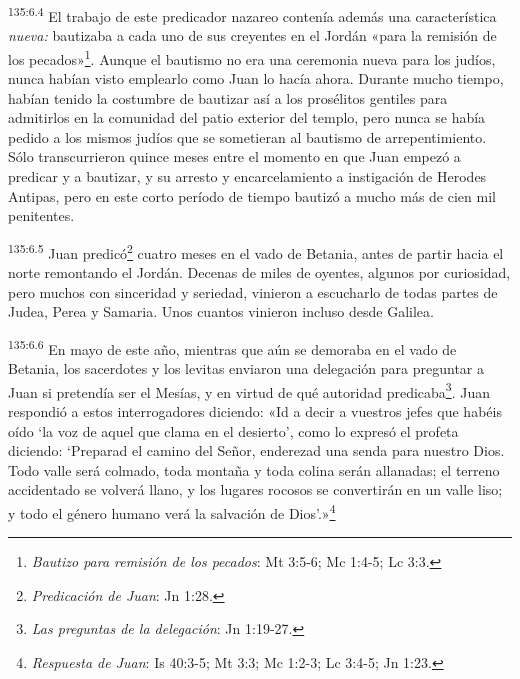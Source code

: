 \par
\textsuperscript{135:6.4} El trabajo de este predicador nazareo contenía además una característica \textit{nueva:} bautizaba a cada uno de sus creyentes en el Jordán «para la remisión de los pecados»\footnote{\textit{Bautizo para remisión de los pecados}: Mt 3:5-6; Mc 1:4-5; Lc 3:3.}. Aunque el bautismo no era una ceremonia nueva para los judíos, nunca habían visto emplearlo como Juan lo hacía ahora. Durante mucho tiempo, habían tenido la costumbre de bautizar así a los prosélitos gentiles para admitirlos en la comunidad del patio exterior del templo, pero nunca se había pedido a los mismos judíos que se sometieran al bautismo de arrepentimiento. Sólo transcurrieron quince meses entre el momento en que Juan empezó a predicar y a bautizar, y su arresto y encarcelamiento a instigación de Herodes Antipas, pero en este corto período de tiempo bautizó a mucho más de cien mil penitentes.

\par
\textsuperscript{135:6.5} Juan predicó\footnote{\textit{Predicación de Juan}: Jn 1:28.} cuatro meses en el vado de Betania, antes de partir hacia el norte remontando el Jordán. Decenas de miles de oyentes, algunos por curiosidad, pero muchos con sinceridad y seriedad, vinieron a escucharlo de todas partes de Judea, Perea y Samaria. Unos cuantos vinieron incluso desde Galilea.

\par
\textsuperscript{135:6.6} En mayo de este año, mientras que aún se demoraba en el vado de Betania, los sacerdotes y los levitas enviaron una delegación para preguntar a Juan si pretendía ser el Mesías, y en virtud de qué autoridad predicaba\footnote{\textit{Las preguntas de la delegación}: Jn 1:19-27.}. Juan respondió a estos interrogadores diciendo: «Id a decir a vuestros jefes que habéis oído `la voz de aquel que clama en el desierto', como lo expresó el profeta diciendo: `Preparad el camino del Señor, enderezad una senda para nuestro Dios. Todo valle será colmado, toda montaña y toda colina serán allanadas; el terreno accidentado se volverá llano, y los lugares rocosos se convertirán en un valle liso; y todo el género humano verá la salvación de Dios'.»\footnote{\textit{Respuesta de Juan}: Is 40:3-5; Mt 3:3; Mc 1:2-3; Lc 3:4-5; Jn 1:23.}


